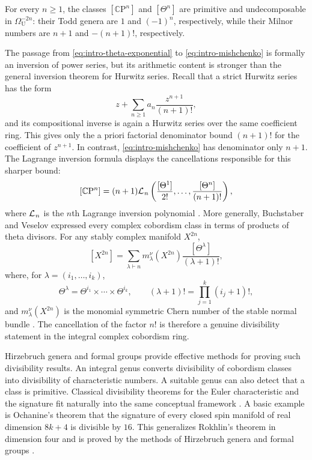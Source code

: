 \documentclass[14pt,dvipsnames]{extarticle}
\numberwithin{equation}{subsection}
\theoremstyle{plain}
\theoremstyle{definition}
\theoremstyle{definition}
\newcommand{\CP}{\mathbb{C}\mathrm P}
\newcommand{\Ll}{\mathcal L\mkern1mu}
\newcommand{\Uu}{\mathrm{U}}
\begin{document}
For every $n\geq1$, the classes $[\CP^n]$ and $[\Theta^n]$ are primitive
and undecomposable in $\Omega_{\Uu}^{-2n}$: their Todd genera are $1$ and
$(-1)^n$, respectively, while their Milnor numbers are $n+1$ and
$-(n+1)!$, respectively.

The passage from \eqref{eq:intro-theta-exponential} to
\eqref{eq:intro-mishchenko} is formally an inversion of power series, but its
arithmetic content is stronger than the general inversion theorem for Hurwitz
series. Recall that a strict Hurwitz series has the form
\[
 z+\sum_{n\geq1}a_n\frac{z^{n+1}}{(n+1)!},
\]
and its compositional inverse is again a Hurwitz series over the same
coefficient ring. This gives only the a priori factorial denominator bound
\((n+1)!\) for the coefficient of \(z^{n+1}\). In contrast,
\eqref{eq:intro-mishchenko} has denominator only \(n+1\). The Lagrange
inversion formula displays the cancellations responsible for this sharper bound:
\begin{equation}\label{eq:intro-lagrange}
 [\CP^n]
 =(n+1)\Ll_n\left(
 \frac{[\Theta^1]}{2!},\ldots,
 \frac{[\Theta^n]}{(n+1)!}
 \right),
\end{equation}
where \(\Ll_n\) is the \(n\)th Lagrange inversion polynomial
\cite{BV26}. More generally, Buchstaber and Veselov expressed every complex
cobordism class in terms of products of theta divisors. For any stably
complex manifold $X^{2n}$,
\begin{equation}\label{eq:intro-BV-normal-Chern}
 [X^{2n}]
 =\sum_{\lambda\vdash n}
 m_\lambda^\nu(X^{2n})\frac{[\Theta^\lambda]}{(\lambda+1)!},
\end{equation}
where, for $\lambda=(i_1,\ldots,i_k)$,
\[
 \Theta^\lambda=\Theta^{i_1}\times\cdots\times\Theta^{i_k},
 \qquad
 (\lambda+1)!=\prod_{j=1}^k(i_j+1)!,
\]
and $m_\lambda^\nu(X^{2n})$ is the monomial symmetric Chern number of the
stable normal bundle \cite[formula~(6)]{BV24}. The cancellation of the factor \(n!\) is therefore a genuine
divisibility statement in the integral complex cobordism ring.

Hirzebruch genera and formal groups provide effective methods for proving such
divisibility results. An integral genus converts divisibility of cobordism
classes into divisibility of characteristic numbers. A suitable genus can also
detect that a class is primitive. Classical divisibility theorems for the
Euler characteristic and the signature fit naturally into the same conceptual framework
\cite{Hir66}. A basic example is Ochanine's theorem that the signature of every
closed spin manifold of real dimension \(8k+4\) is divisible by \(16\). This
generalizes Rokhlin's theorem in dimension four and is proved by the methods of
Hirzebruch genera and formal groups \cite{Rok52,Och81}.
\end{document}
